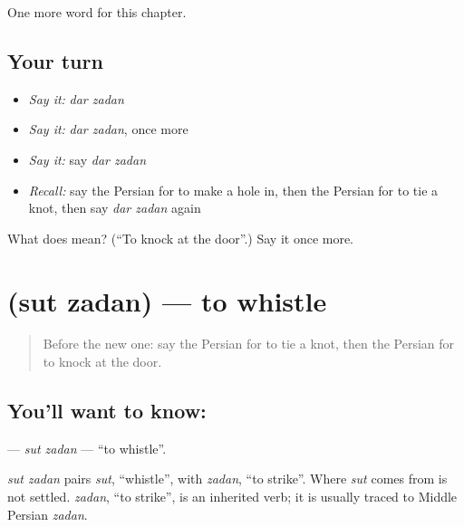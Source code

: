 \begin{grammarlens}[title={What you've built}]
One more word for this chapter.
\end{grammarlens}

\subsection*{Your turn}
\begin{itemize}
\raggedright
  \item \emph{Say it:} \emph{dar zadan}
  \item \emph{Say it:} \emph{dar zadan}, once more
  \item \emph{Say it:} say \emph{dar zadan}
  \item \emph{Recall:} say the Persian for to make a hole in, then the Persian for to tie a knot, then say \emph{dar zadan} again
\end{itemize}

\begin{tcolorbox}[breakable,colback=teal!4,colframe=teal!35!black,title={Before you move on}]
What does   mean? (\textquotedblleft{}To knock at the door\textquotedblright{}.) Say it once more.
\end{tcolorbox}
\section[\texorpdfstring{\fa{سوت} \fa{زدن} (sut zadan)}{سوت زدن (sut zadan)}]{  (sut zadan) — to whistle}

\label{lesson:FA-C260-sut-zadan}



\begin{quote}
Before the new one: say the Persian for to tie a knot, then the Persian for to knock at the door.
\end{quote}

\subsection*{You'll want to know:  }
\textbf{ } — \emph{sut zadan} — \textquotedblleft{}to whistle\textquotedblright{}.

\begin{cousinweb}
\emph{sut zadan} pairs \emph{sut}, \textquotedblleft{}whistle\textquotedblright{}, with \emph{zadan}, \textquotedblleft{}to strike\textquotedblright{}. Where \emph{sut} comes from is not settled. \emph{zadan}, \textquotedblleft{}to strike\textquotedblright{}, is an inherited verb; it is usually traced to Middle Persian \emph{zadan}.
\end{cousinweb}

